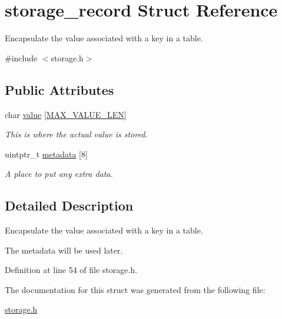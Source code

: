 \hypertarget{structstorage__record}{\section{storage\-\_\-record Struct Reference}
\label{structstorage__record}
}


Encapsulate the value associated with a key in a table.  




{\ttfamily \#include $<$storage.\-h$>$}

\subsection*{Public Attributes}
\begin{DoxyCompactItemize}
\item 
\hypertarget{structstorage__record_a114ea83d63789debe24f3857f8222933}{char \hyperlink{structstorage__record_a114ea83d63789debe24f3857f8222933}{value} \mbox{[}\hyperlink{storage_8h_a00a29850f2b5b985f776f864d83e5ac3}{M\-A\-X\-\_\-\-V\-A\-L\-U\-E\-\_\-\-L\-E\-N}\mbox{]}}\label{structstorage__record_a114ea83d63789debe24f3857f8222933}

\begin{DoxyCompactList}\small\item\em This is where the actual value is stored. \end{DoxyCompactList}\item 
\hypertarget{structstorage__record_ab9bb60cfd2dc26f6a49218d6b8612dca}{uintptr\-\_\-t \hyperlink{structstorage__record_ab9bb60cfd2dc26f6a49218d6b8612dca}{metadata} \mbox{[}8\mbox{]}}\label{structstorage__record_ab9bb60cfd2dc26f6a49218d6b8612dca}

\begin{DoxyCompactList}\small\item\em A place to put any extra data. \end{DoxyCompactList}\end{DoxyCompactItemize}


\subsection{Detailed Description}
Encapsulate the value associated with a key in a table. 

The metadata will be used later. 

Definition at line 54 of file storage.\-h.



The documentation for this struct was generated from the following file\-:\begin{DoxyCompactItemize}
\item 
\hyperlink{storage_8h}{storage.\-h}\end{DoxyCompactItemize}
